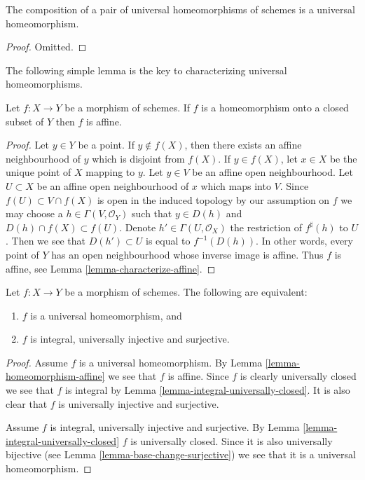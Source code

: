 \begin{lemma}
\label{lemma-composition-universal-homeomorphism}
The composition of a pair of universal homeomorphisms of
schemes is a universal homeomorphism.
\end{lemma}

\begin{proof}
Omitted.
\end{proof}

\noindent
The following simple lemma is the key to characterizing universal
homeomorphisms.

\begin{lemma}
\label{lemma-homeomorphism-affine}
Let $f : X \to Y$ be a morphism of schemes. If $f$ is a homeomorphism
onto a closed subset of $Y$ then $f$ is affine.
\end{lemma}

\begin{proof}
Let $y \in Y$ be a point. If $y \not \in f(X)$, then there exists
an affine neighbourhood of $y$ which is disjoint from $f(X)$.
If $y \in f(X)$, let $x \in X$ be the unique point of $X$ mapping to $y$.
Let $y \in V$ be an affine open neighbourhood.
Let $U \subset X$ be an affine open neighbourhood of $x$ which maps into $V$.
Since $f(U) \subset V \cap f(X)$ is open in the induced topology by our
assumption on $f$ we may choose a
$h \in \Gamma(V, \mathcal{O}_Y)$ such that $y \in D(h)$
and $D(h) \cap f(X) \subset f(U)$. Denote $h' \in \Gamma(U, \mathcal{O}_X)$
the restriction of $f^\sharp(h)$ to $U$. Then we see that
$D(h') \subset U$ is equal to $f^{-1}(D(h))$. In other words, every point
of $Y$ has an open neighbourhood whose inverse image is affine.
Thus $f$ is affine, see
Lemma \ref{lemma-characterize-affine}.
\end{proof}

\begin{lemma}
\label{lemma-universal-homeomorphism}
Let $f : X \to Y$ be a morphism of schemes. The following are
equivalent:
\begin{enumerate}
\item $f$ is a universal homeomorphism, and
\item $f$ is integral, universally injective and surjective.
\end{enumerate}
\end{lemma}

\begin{proof}
Assume $f$ is a universal homeomorphism. By
Lemma \ref{lemma-homeomorphism-affine}
we see that $f$ is affine. Since $f$ is clearly universally closed we
see that $f$ is integral by
Lemma \ref{lemma-integral-universally-closed}.
It is also clear that $f$ is universally injective and surjective.

\medskip\noindent
Assume $f$ is integral, universally injective and surjective. By
Lemma \ref{lemma-integral-universally-closed}
$f$ is universally closed. Since it is also universally bijective (see
Lemma \ref{lemma-base-change-surjective})
we see that it is a universal homeomorphism.
\end{proof}

